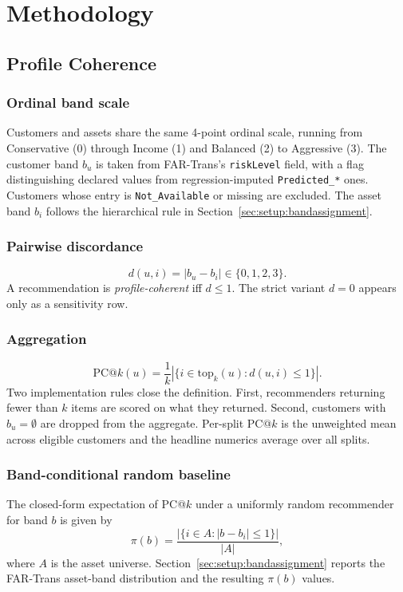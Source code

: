 \section{Methodology}
\label{sec:method}

\subsection{Profile Coherence}
\label{sec:method:pck}

\subsubsection{Ordinal band scale}
Customers and assets share the same 4-point ordinal scale, running from Conservative (0) through Income (1) and Balanced (2) to Aggressive (3). The customer band $b_u$ is taken from FAR-Trans's \texttt{riskLevel} field, with a flag distinguishing declared values from regression-imputed \texttt{Predicted\_*} ones. Customers whose entry is \texttt{Not\_Available} or missing are excluded. The asset band $b_i$ follows the hierarchical rule in Section~\ref{sec:setup:bandassignment}.

\subsubsection{Pairwise discordance}
\begin{equation}
d(u, i) = |b_u - b_i| \in \{0, 1, 2, 3\}.
\end{equation}
A recommendation is \emph{profile-coherent} iff $d \leq 1$. The strict variant $d = 0$ appears only as a sensitivity row.

\subsubsection{Aggregation}
\begin{equation}
\text{PC@}k(u) = \frac{1}{k} \left|\{ i \in \text{top}_k(u) : d(u, i) \leq 1 \}\right|.
\end{equation}
Two implementation rules close the definition. First, recommenders returning fewer than $k$ items are scored on what they returned. Second, customers with $b_u = \emptyset$ are dropped from the aggregate. Per-split PC@$k$ is the unweighted mean across eligible customers and the headline numerics average over all splits.

\subsubsection{Band-conditional random baseline}
The closed-form expectation of PC@$k$ under a uniformly random recommender for band $b$ is given by
\begin{equation}
\pi(b) = \frac{|\{ i \in A : |b - b_i| \leq 1 \}|}{|A|},
\end{equation}
where $A$ is the asset universe. Section~\ref{sec:setup:bandassignment} reports the FAR-Trans asset-band distribution and the resulting $\pi(b)$ values.

